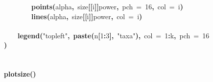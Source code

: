 \documentclass{elsarticle}
\makeatletter
\newcommand{\hlnumber}[1]{\textcolor[rgb]{0,0,0}{#1}}%
\newcommand{\hlfunctioncall}[1]{\textcolor[rgb]{.5,0,.33}{\textbf{#1}}}%
\newcommand{\hlstring}[1]{\textcolor[rgb]{.6,.6,1}{#1}}%
\newcommand{\hlkeyword}[1]{\textbf{#1}}%
\newcommand{\hlargument}[1]{\textcolor[rgb]{.69,.25,.02}{#1}}%
\newcommand{\hlsymbol}[1]{#1}%
\newcommand{\hlstd}[1]{\textcolor[rgb]{0,0,0}{#1}}%
\newenvironment{kframe}{%
 \def\FrameCommand##1{\hskip\@totalleftmargin \hskip-\fboxsep
 \colorbox{shadecolor}{##1}\hskip-\fboxsep
     \hskip-\linewidth \hskip-\@totalleftmargin \hskip\columnwidth}%
 \MakeFramed {\advance\hsize-\width
   \@totalleftmargin\z@ \linewidth\hsize
   \@setminipage}}%
 {\par\unskip\endMakeFramed}
\newenvironment{knitrout}{}{} %
\makeatother
\begin{document}
\begin{figure}
\begin{center}
\begin{knitrout}
{\begin{kframe}
\begin{flushleft}
\hlstd{}{\ }{\ }{\ }{\ }{\ }{\ }{\ }{\ }\hlfunctioncall{points}\hlkeyword{(}\hlsymbol{alpha}\hlkeyword{,}{\ }\hlsymbol{size}\hlkeyword{[[}\hlsymbol{i}\hlkeyword{]}\hlkeyword{]}\hlkeyword{\usebox{\hlnormalsizeboxdollar}}\hlsymbol{power}\hlkeyword{,}{\ }\hlargument{pch}{\ }\hlargument{=}{\ }\hlnumber{16}\hlkeyword{,}{\ }\hlargument{col}{\ }\hlargument{=}{\ }\hlsymbol{i}\hlkeyword{)}\hspace*{\fill}\\
\hlstd{}{\ }{\ }{\ }{\ }{\ }{\ }{\ }{\ }\hlfunctioncall{lines}\hlkeyword{(}\hlsymbol{alpha}\hlkeyword{,}{\ }\hlsymbol{size}\hlkeyword{[[}\hlsymbol{i}\hlkeyword{]}\hlkeyword{]}\hlkeyword{\usebox{\hlnormalsizeboxdollar}}\hlsymbol{power}\hlkeyword{,}{\ }\hlargument{col}{\ }\hlargument{=}{\ }\hlsymbol{i}\hlkeyword{)}\hspace*{\fill}\\
\hlstd{}{\ }{\ }{\ }{\ }\hlkeyword{\usebox{\hlnormalsizeboxclosebrace}}\hspace*{\fill}\\
\hlstd{}{\ }{\ }{\ }{\ }\hlfunctioncall{legend}\hlkeyword{(}\hlstring{"{}topleft"{}}\hlkeyword{,}{\ }\hlfunctioncall{paste}\hlkeyword{(}\hlsymbol{n}\hlkeyword{[}\hlnumber{1}\hlkeyword{:}\hlnumber{3}\hlkeyword{]}\hlkeyword{,}{\ }\hlstring{"{}taxa"{}}\hlkeyword{)}\hlkeyword{,}{\ }\hlargument{col}{\ }\hlargument{=}{\ }\hlnumber{1}\hlkeyword{:}\hlsymbol{k}\hlkeyword{,}{\ }\hlargument{pch}{\ }\hlargument{=}{\ }\hlnumber{16}\hlkeyword{)}\hspace*{\fill}\\
\hlstd{}\hspace*{\fill}\\
\hlstd{}\hlkeyword{\usebox{\hlnormalsizeboxclosebrace}}\hspace*{\fill}\\
\hlstd{}\hlfunctioncall{plot\usebox{\hlnormalsizeboxunderscore}size}\hlkeyword{(}\hlkeyword{)}\mbox{}
\normalfont
\end{flushleft}



\end{kframe}}
\end{knitrout}
\end{center}
\end{figure}
\end{document}
